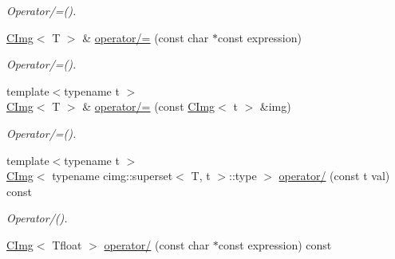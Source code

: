 \begin{DoxyCompactItemize}
\begin{DoxyCompactList}\small\item\em Operator/=(). \item\end{DoxyCompactList}\item 
\hypertarget{structcimg__library_1_1CImg_aa5976a12040985685847897d02ddd478}{
\hyperlink{structcimg__library_1_1CImg}{CImg}$<$ T $>$ \& \hyperlink{structcimg__library_1_1CImg_aa5976a12040985685847897d02ddd478}{operator/=} (const char $\ast$const expression)}
\label{structcimg__library_1_1CImg_aa5976a12040985685847897d02ddd478}

\begin{DoxyCompactList}\small\item\em Operator/=(). \item\end{DoxyCompactList}\item 
\hypertarget{structcimg__library_1_1CImg_a961e682342f88bf0a0cfbd497bf548d4}{
{\footnotesize template$<$typename t $>$ }\\\hyperlink{structcimg__library_1_1CImg}{CImg}$<$ T $>$ \& \hyperlink{structcimg__library_1_1CImg_a961e682342f88bf0a0cfbd497bf548d4}{operator/=} (const \hyperlink{structcimg__library_1_1CImg}{CImg}$<$ t $>$ \&img)}
\label{structcimg__library_1_1CImg_a961e682342f88bf0a0cfbd497bf548d4}

\begin{DoxyCompactList}\small\item\em Operator/=(). \item\end{DoxyCompactList}\item 
\hypertarget{structcimg__library_1_1CImg_abede9dfa0091a1f6b58bb27396c7d209}{
{\footnotesize template$<$typename t $>$ }\\\hyperlink{structcimg__library_1_1CImg}{CImg}$<$ typename cimg::superset$<$ T, t $>$::type $>$ \hyperlink{structcimg__library_1_1CImg_abede9dfa0091a1f6b58bb27396c7d209}{operator/} (const t val) const }
\label{structcimg__library_1_1CImg_abede9dfa0091a1f6b58bb27396c7d209}

\begin{DoxyCompactList}\small\item\em Operator/(). \item\end{DoxyCompactList}\item 
\hypertarget{structcimg__library_1_1CImg_ab5f28378df868625bbeba0b94e0b2157}{
\hyperlink{structcimg__library_1_1CImg}{CImg}$<$ Tfloat $>$ \hyperlink{structcimg__library_1_1CImg_ab5f28378df868625bbeba0b94e0b2157}{operator/} (const char $\ast$const expression) const }
\label{structcimg__library_1_1CImg_ab5f28378df868625bbeba0b94e0b2157}


\end{DoxyCompactItemize}
